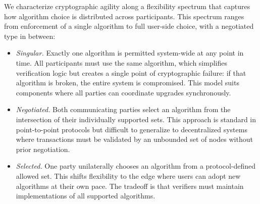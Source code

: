 We characterize cryptographic agility along a flexibility spectrum that captures how algorithm choice is distributed across participants.
This spectrum ranges from enforcement of a single algorithm to full user-side choice, with a negotiated type in between:

\begin{itemize}
    \item \emph{Singular.} Exactly one algorithm is permitted system-wide at any point in time.
    All participants must use the same algorithm, which simplifies verification logic but creates a single point of cryptographic failure: if that algorithm is broken, the entire system is compromised.
    This model suits components where all parties can coordinate upgrades synchronously.
    
    
    \item \emph{Negotiated.} Both communicating parties select an algorithm from the intersection of their individually supported sets.
    This approach is standard in point-to-point protocols but difficult to generalize to decentralized systems where transactions must be validated by an unbounded set of nodes without prior negotiation.
    
    \item \emph{Selected.} One party unilaterally chooses an algorithm from a protocol-defined allowed set.
    This shifts flexibility to the edge where users can adopt new algorithms at their own pace.
    The tradeoff is that verifiers must maintain implementations of all supported algorithms.
\end{itemize}

